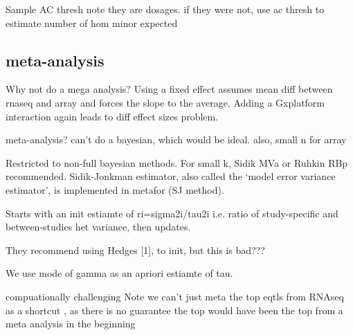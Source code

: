Sample AC thresh
    note they are dosages. if they were not, use ac thresh to estimate number of hom minor expected

\subsection{ meta-analysis}

Why not do a mega analysis? 
Using a fixed effect assumes mean diff between rnaseq and array and forces the slope to the average.
Adding a Gxplatform interaction again leads to diff effect sizes problem.

meta-analysis?
can't do a bayesian, which would be ideal.
also, small n for array


Restricted to non-full bayesian methods.
For small k, Sidik MVa or Ruhkin RBp recommended.
Sidik-Jonkman estimator, also called the ‘model error variance estimator’, is implemented in metafor (SJ method).

Starts with an init estiamte of ri=sigma2i/tau2i i.e. ratio of study-specific and between-studies het variance, then updates.

They recommend using Hedges [1], to init, but this is bad???

We use mode of gamma as an apriori estiamte of tau.

compuationally challenging
Note we can't just meta the top eqtls from RNAseq as a shortcut , as there is no guarantee the top would have been the top from a meta analysis in the beginning

